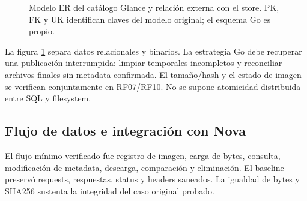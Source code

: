 \documentclass[12pt,a4paper]{article}
\begin{document}
\Needspace{275pt}
\begin{figure}[!ht]
\centering
{}
\caption{Modelo ER del catálogo Glance y relación externa con el store. PK, FK y UK identifican claves del modelo original; el esquema Go es propio.}
\label{fig:er}
\end{figure}
\FloatBarrier
La figura \ref{fig:er} separa datos relacionales y binarios. La estrategia Go debe recuperar una publicación interrumpida: limpiar temporales incompletos y reconciliar archivos finales sin metadata confirmada. El tamaño/hash y el estado de imagen se verifican conjuntamente en RF07/RF10. No se supone atomicidad distribuida entre SQL y filesystem.

\subsection{Flujo de datos e integración con Nova}
El flujo mínimo verificado fue registro de imagen, carga de bytes, consulta, modificación de metadata, descarga, comparación y eliminación. El baseline preservó requests, respuestas, status y headers saneados. La igualdad de bytes y SHA256 sustenta la integridad del caso original probado.
\end{document}
